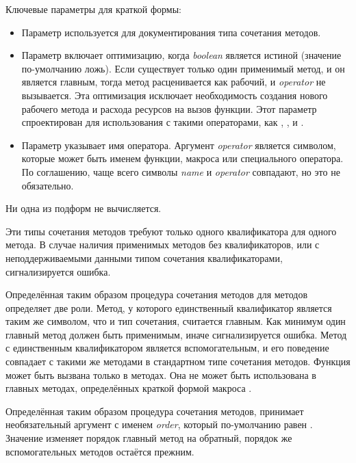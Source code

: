 \begin{defmac}
Ключевые параметры для краткой формы:

\begin{itemize}

\item 
Параметр  используется для документирования типа сочетания
методов. 

\item 
Параметр  включает оптимизацию, когда
\emph{boolean} является истиной (значение по-умолчанию ложь). Если существует
только один применимый метод, и он является главным, тогда метод расценивается
как рабочий, и \emph{operator} не вызывается.
Эта оптимизация исключает необходимость создания нового рабочего метода и
расхода ресурсов на вызов функции. Этот параметр спроектирован для использования
с такими операторами, как , , \cdf{+} и
.

\item 
Параметр  указывает имя оператора. Аргумент \emph{operator}
является символом, которые может быть именем функции, макроса или специального
оператора. По соглашению, чаще всего символы \emph{name} и \emph{operator}
совпадают, но это не обязательно.
\end{itemize}

Ни одна из подформ не вычисляется.

Эти типы сочетания методов требуют только одного квалификатора для одного
метода. В случае наличия применимых методов без квалификаторов, или с
неподдерживаемыми данными типом сочетания квалификаторами, сигнализируется
ошибка.

Определённая таким образом процедура сочетания методов для методов определяет
две роли. Метод, у которого единственный квалификатор является таким же
символом, что и тип сочетания, считается главным. Как минимум один главный метод
должен быть применимым, иначе сигнализируется ошибка. Метод с единственным
квалификатором  является вспомогательным, и его поведение совпадает
с такими же методами в стандартном типе сочетания методов. Функция
 может быть вызвана только в  методах. Она не
может быть использована в главных методах, определённых краткой формой макроса
. 

Определённая таким образом процедура сочетания методов, принимает необязательный
аргумент с именем \emph{order}, который по-умолчанию равен
. Значение  изменяет порядок
главный метод на обратный, порядок же вспомогательных методов остаётся прежним.


\end{defmac}
